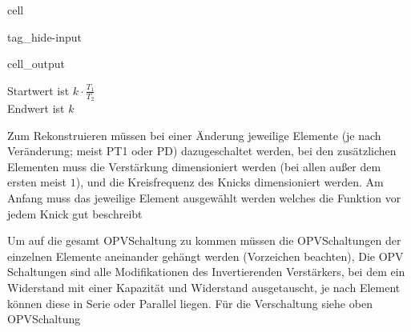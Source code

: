 \documentclass[letterpaper,10pt,english]{jupyterBook}
\begin{document}
\begin{sphinxuseclass}{cell}
\begin{sphinxuseclass}{tag_hide-input}\begin{sphinxVerbatimOutput}

\begin{sphinxuseclass}{cell_output}
\begin{sphinxVerbatim}
\end{sphinxVerbatim}

\noindent{}

\end{sphinxuseclass}\end{sphinxVerbatimOutput}

\end{sphinxuseclass}
\end{sphinxuseclass}
\sphinxAtStartPar
Startwert ist \(k\cdot\frac{T_1}{T_2}\)\\
Endwert ist \(k\)

\begin{DUlineblock}{0em}
\item[] 
\end{DUlineblock}

\sphinxAtStartPar
Zum Rekonstruieren müssen bei einer Änderung jeweilige Elemente (je nach Veränderung; meist PT1 oder PD) dazugeschaltet werden,
bei den zusätzlichen Elementen muss die Verstärkung dimensioniert werden (bei allen außer dem ersten meist \(1\)),
und die Kreisfrequenz des Knicks dimensioniert werden.
Am Anfang muss das jeweilige Element ausgewählt werden welches die Funktion vor jedem Knick gut beschreibt

\sphinxAtStartPar
Um auf die gesamt OPV\sphinxhyphen{}Schaltung zu kommen müssen die OPV\sphinxhyphen{}Schaltungen der einzelnen Elemente aneinander gehängt werden (Vorzeichen beachten),
Die OPV Schaltungen sind alle Modifikationen des Invertierenden Verstärkers,
bei dem ein Widerstand mit einer Kapazität und Widerstand ausgetauscht,
je nach Element können diese in Serie oder Parallel liegen.
Für die Verschaltung siehe oben OPV\sphinxhyphen{}Schaltung
\end{document}
